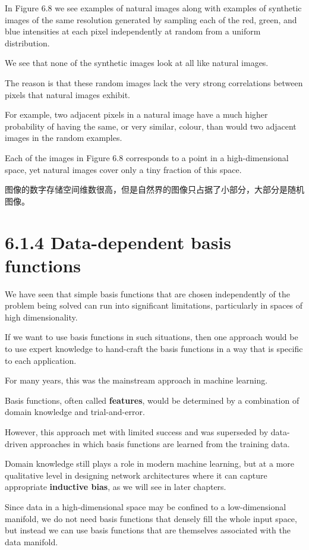 \documentclass{article}
\begin{document}
In Figure 6.8 we see examples of natural images along with examples of synthetic images of the same resolution generated by sampling each of the red, green, and blue intensities at each pixel independently at random from a uniform distribution. 

We see that none of the synthetic images look at all like natural images. 

The reason is that these random images lack the very strong correlations between pixels that natural images exhibit. 

For example, two adjacent pixels in a natural image have a much higher probability of having the same, or very similar, colour, than would two adjacent images in the random examples. 

Each of the images in Figure 6.8 corresponds to a point in a high-dimensional space, yet natural images cover only a tiny fraction of this space.

{\color{red}
图像的数字存储空间维数很高，但是自然界的图像只占据了小部分，大部分是随机图像。
}


\section{6.1.4 Data-dependent basis functions}

We have seen that simple basis functions that are chosen independently of the problem being solved can run into significant limitations, particularly in spaces of high dimensionality. 

If we want to use basis functions in such situations, then one approach would be to use expert knowledge to hand-craft the basis functions in a way that is specific to each application. 

For many years, this was the mainstream approach in machine learning. 

Basis functions, often called \textbf{features}, would be determined by a combination of domain knowledge and trial-and-error. 

However, this approach met with limited success and was superseded by data-driven approaches in which basis functions are learned from the training data. 

Domain knowledge still plays a role in modern machine learning, but at a more qualitative level in designing network architectures where it can capture appropriate \textbf{inductive bias}, as we will see in later chapters.

Since data in a high-dimensional space may be confined to a low-dimensional manifold, we do not need basis functions that densely fill the whole input space, but instead we can use basis functions that are themselves associated with the data manifold. 
\end{document}
